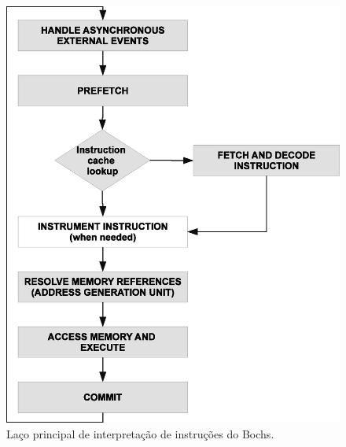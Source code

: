 \documentclass[11pt,twoside]{article}
\begin{document}
\begin{figure}[!h]
  	\begin{center}
    	\includegraphics[scale=0.5]{figures/bochs_loop.eps}
	\end{center}
	\caption{Laço principal de interpretação de instruções do Bochs.}
	\label{fig:bochs_loop}
\end{figure}
\end{document}
